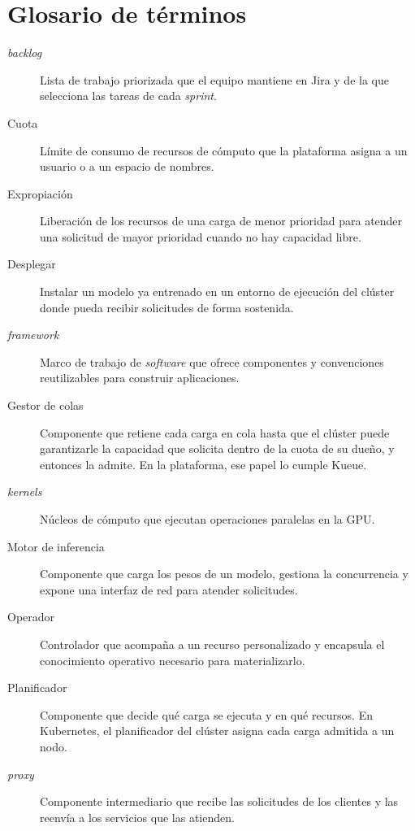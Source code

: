 \documentclass[letterpaper,11pt]{report}
\begin{document}
\chapter*{Glosario de términos}
\begin{description}
  \item[\emph{backlog}] Lista de trabajo priorizada que el equipo mantiene en Jira y de la que selecciona las tareas de cada \emph{sprint}.
  \item[Cuota] Límite de consumo de recursos de cómputo que la plataforma asigna a un usuario o a un espacio de nombres.
  \item[Expropiación] Liberación de los recursos de una carga de menor prioridad para atender una solicitud de mayor prioridad cuando no hay capacidad libre.
  \item[Desplegar] Instalar un modelo ya entrenado en un entorno de ejecución del clúster donde pueda recibir solicitudes de forma sostenida.
  \item[\emph{framework}] Marco de trabajo de \emph{software} que ofrece componentes y convenciones reutilizables para construir aplicaciones.
  \item[Gestor de colas] Componente que retiene cada carga en cola hasta que el clúster puede garantizarle la capacidad que solicita dentro de la cuota de su dueño, y entonces la admite. En la plataforma, ese papel lo cumple Kueue.
  \item[\emph{kernels}] Núcleos de cómputo que ejecutan operaciones paralelas en la GPU.
  \item[Motor de inferencia] Componente que carga los pesos de un modelo, gestiona la concurrencia y expone una interfaz de red para atender solicitudes.
  \item[Operador] Controlador que acompaña a un recurso personalizado y encapsula el conocimiento operativo necesario para materializarlo.
  \item[Planificador] Componente que decide qué carga se ejecuta y en qué recursos. En Kubernetes, el planificador del clúster asigna cada carga admitida a un nodo.
  \item[\emph{proxy}] Componente intermediario que recibe las solicitudes de los clientes y las reenvía a los servicios que las atienden.

\end{description}
\end{document}
